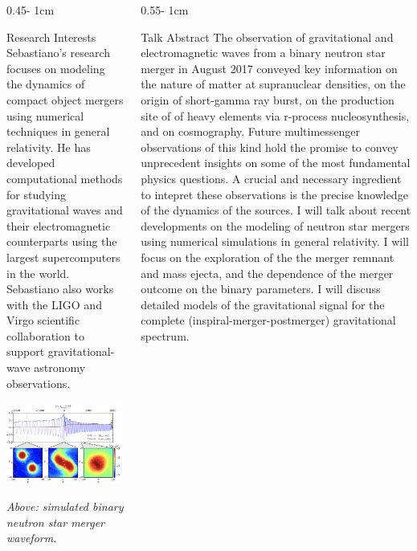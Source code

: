 \documentclass{psuposter}
\begin{document}
\begin{frame}
\begin{columns}[onlytextwidth]
\begin{column}{0.45\textwidth - 1cm}
    \begin{block}{Research Interests}
        Sebastiano's research focuses on modeling the dynamics of compact object mergers using numerical techniques in general relativity. He has developed computational methods for studying gravitational waves and their electromagnetic counterparts using the largest supercomputers in the world. Sebastiano also works with the LIGO and Virgo scientific collaboration to support gravitational-wave astronomy observations. 
        \begin{center}
	    	\includegraphics[width=0.98\textwidth]{psuposter-images/bernuzzi-merger}    		
    	\end{center}
    	\textit{Above: simulated binary neutron star merger waveform}. \cite{bernuzziModelingCompleteGravitational2015}
    \end{block}
\end{column}


\begin{column}{0.55\textwidth - 1cm}
    \begin{block}{Talk Abstract}
        The observation of gravitational and electromagnetic waves from a binary neutron star merger in August 2017 conveyed key information on the nature of matter at supranuclear densities, on the origin of short-gamma ray burst, on the production site of of heavy elements via r-process nucleosynthesis, and on cosmography. Future multimessenger observations of this kind hold the promise to convey unprecedent insights on some of the most fundamental physics questions. A crucial and necessary ingredient to intepret these observations is the precise knowledge of the dynamics of the sources. I will talk about recent developments on the modeling of neutron star mergers using numerical simulations in general relativity. I will focus on the exploration of the the merger remnant and mass ejecta, and the dependence of the merger outcome on the binary parameters. I will discuss detailed models of the gravitational signal for the complete (inspiral-merger-postmerger) gravitational spectrum.
    \end{block}


\end{column}
\end{columns}
\end{frame}
\end{document}

